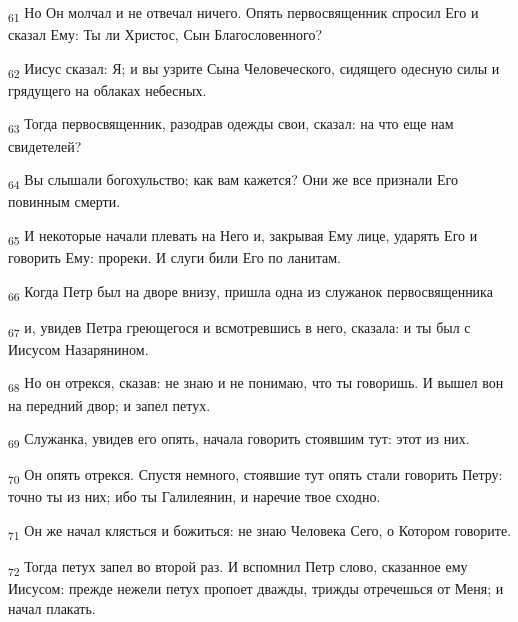 \begin{tcolorbox}
\textsubscript{61} Но Он молчал и не отвечал ничего. Опять первосвященник спросил Его и сказал Ему: Ты ли Христос, Сын Благословенного?
\end{tcolorbox}
\begin{tcolorbox}
\textsubscript{62} Иисус сказал: Я; и вы узрите Сына Человеческого, сидящего одесную силы и грядущего на облаках небесных.
\end{tcolorbox}
\begin{tcolorbox}
\textsubscript{63} Тогда первосвященник, разодрав одежды свои, сказал: на что еще нам свидетелей?
\end{tcolorbox}
\begin{tcolorbox}
\textsubscript{64} Вы слышали богохульство; как вам кажется? Они же все признали Его повинным смерти.
\end{tcolorbox}
\begin{tcolorbox}
\textsubscript{65} И некоторые начали плевать на Него и, закрывая Ему лице, ударять Его и говорить Ему: прореки. И слуги били Его по ланитам.
\end{tcolorbox}
\begin{tcolorbox}
\textsubscript{66} Когда Петр был на дворе внизу, пришла одна из служанок первосвященника
\end{tcolorbox}
\begin{tcolorbox}
\textsubscript{67} и, увидев Петра греющегося и всмотревшись в него, сказала: и ты был с Иисусом Назарянином.
\end{tcolorbox}
\begin{tcolorbox}
\textsubscript{68} Но он отрекся, сказав: не знаю и не понимаю, что ты говоришь. И вышел вон на передний двор; и запел петух.
\end{tcolorbox}
\begin{tcolorbox}
\textsubscript{69} Служанка, увидев его опять, начала говорить стоявшим тут: этот из них.
\end{tcolorbox}
\begin{tcolorbox}
\textsubscript{70} Он опять отрекся. Спустя немного, стоявшие тут опять стали говорить Петру: точно ты из них; ибо ты Галилеянин, и наречие твое сходно.
\end{tcolorbox}
\begin{tcolorbox}
\textsubscript{71} Он же начал клясться и божиться: не знаю Человека Сего, о Котором говорите.
\end{tcolorbox}
\begin{tcolorbox}
\textsubscript{72} Тогда петух запел во второй раз. И вспомнил Петр слово, сказанное ему Иисусом: прежде нежели петух пропоет дважды, трижды отречешься от Меня; и начал плакать.
\end{tcolorbox}
